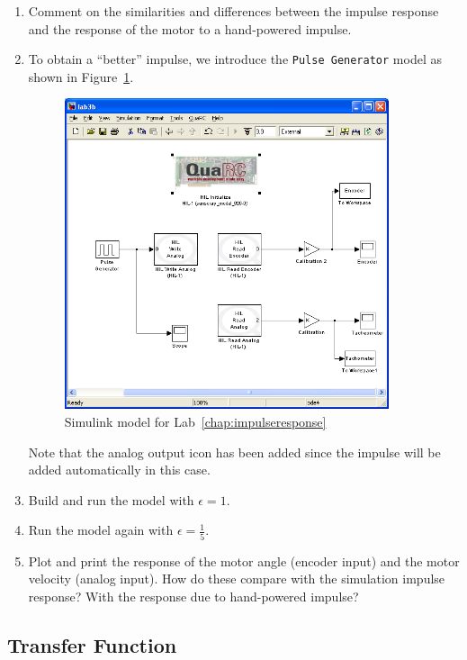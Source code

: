 \begin{enumerate}
\item Comment on the similarities and differences between the impulse
response and the response of the motor to a hand-powered impulse.

\item To obtain a ``better'' impulse, we introduce the \verb|Pulse Generator|
model as shown in Figure~\ref{fig:model3b}\@.
\begin{figure}
\includegraphics[width=0.9\textwidth]{pix/lab3.PNG} 
\caption{\textsf{Simulink} model for Lab~\ref{chap:impulseresponse}}\label{fig:model3b}
\end{figure}%
Note that the analog output icon has been added since the impulse will be
added automatically in this case.

\item Build and run the model with $\epsilon =1$\@.

\item Run the model again with $\epsilon=\frac{1}{5}$\@.

\item Plot and print the response of the motor angle (encoder input) and the
motor velocity (analog input).  How do these compare with the simulation
impulse response?  With the response due to hand-powered impulse?
\end{enumerate}

\subsection{Transfer Function}

